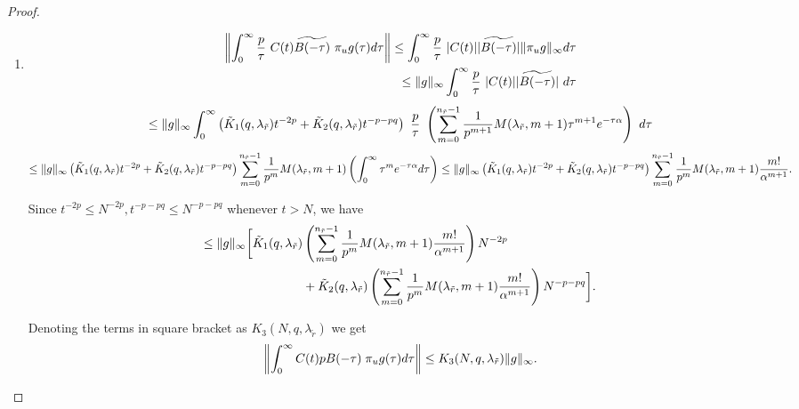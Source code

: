 \begin{proof}
	\begin{enumerate}
		\item 
		\begin{align} \label{any3}
		\begin{split}
		\left\| \int_{0}^{\infty} \frac{p}{\tau}~C(t)  \widetilde{B(-\tau)} ~ \pi_ug(\tau) d\tau \right\| \leq  \int_{0}^{\infty} \frac{p}{\tau}~ \lvert C(t)\rvert  \lvert \widetilde{B(-\tau)}\rvert \lVert \pi_ug\rVert_{\infty} d \tau \\ 
		\leq \lVert g\rVert_{\infty} \int_{0}^{\infty} \frac{p}{\tau} ~\lvert C(t)\rvert  \lvert \widetilde{B(-\tau)}\rvert~ d\tau
		\end{split} 
		\end{align}
		\begin{dmath*}
			\leq \inorm{g} \int_{0}^{\infty} \left( \tilde{K}_1(q,\lambda_{\tilde{r}}) t^{-2p} + \tilde{K}_2(q,\lambda_{\tilde{r}}) t^{-p-pq}\right)~\frac{p}{\tau}~ \left( \sum_{m=0}^{n_{\tilde{r}} -1}\frac{1}{p^{m+1}} M(\lambda_{\tilde{r}},m+1) \tau^{m+1} e^{-\tau \alpha} \right)~ d\tau  
		\end{dmath*}
		\begin{dmath}
			\leq \inorm{g} \left( \tilde{K}_1(q,\lambda_{\tilde{r}}) t^{-2p} + \tilde{K}_2(q,\lambda_{\tilde{r}}) t^{-p-pq}\right) \sum_{m=0}^{n_{\tilde{r}} -1} \frac{1}{p^{m}} M(\lambda_{\tilde{r}},m+1) \left( \int_{0}^{\infty} \tau^m e^{-\tau \alpha} d\tau \right) \leq \inorm{g} \left( \tilde{K}_1(q,\lambda_{\tilde{r}}) t^{-2p} + \tilde{K}_2(q,\lambda_{\tilde{r}}) t^{-p-pq}\right) \sum_{m=0}^{n_{\tilde{r}} -1}\frac{1}{p^{m}} M(\lambda_{\tilde{r}},m+1) \frac{m!}{\alpha^{m+1}}. 
		\end{dmath}
		
Since $t^{-2p}\leq N^{-2p}, t^{-p-pq} \leq N^{-p-pq}$ whenever $t > N$, we have
\begin{align}
\begin{split}
\leq \lVert g\rVert_{\infty} \bigg[  \tilde{K}_1(q,\lambda_{\tilde{r}}) &\left(  \sum_{m=0}^{n_{\tilde{r}} -1} \frac{1}{p^{m}} M(\lambda_{\tilde{r}},m+1) \frac{m!}{\alpha^{m+1}} \right) N^{-2p}  \\ &+ \tilde{K}_2(q,\lambda_{\tilde{r}}) \left(  \sum_{m=0}^{n_{\tilde{r}} -1} \frac{1}{p^{m}} M(\lambda_{\tilde{r}},m+1) \frac{m!}{\alpha^{m+1}}\right) N^{-p-pq}\bigg].
\end{split}  
\end{align}
		
Denoting the terms in square bracket as $K_3(N,q,\lambda_{\tilde{r}})$ we get
\begin{align}
\left\| \int_{0}^{\infty} C(t) p B(-\tau) \; \pi_ug(\tau) d\tau \right\| \leq K_3(N,q,\lambda_{\tilde{r}}) \lVert g\rVert_{\infty}.
\end{align}


\end{enumerate}
\end{proof}
